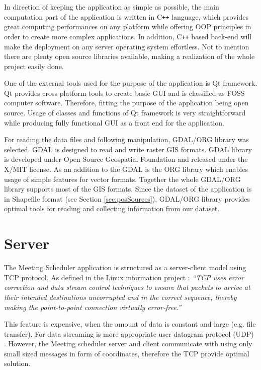 \documentclass[thesis=M,english]{FITthesis}[2012/10/20]
\begin{document}
In direction of keeping the application as simple as possible, the main computation part of the application is written in C\texttt{++} language, which provides great computing performances on any platform while offering OOP principles in order to create more complex applications. In addition, C\texttt{++} based back-end will make the deployment on any server operating system effortless. Not to mention there are plenty open source libraries available, making a realization of the whole project easily done.  

One of the external tools used for the purpose of the application is Qt framework. Qt provides cross-platform tools to create basic GUI and is classified as FOSS computer software. Therefore, fitting the purpose of the application being open source. 
Usage of classes and functions of Qt framework is very straightforward while producing fully functional GUI as a front end for the application. 

For reading the data files and following manipulation, GDAL/ORG library was selected. GDAL is designed to read and write raster GIS formats. GDAL library is developed under Open Source Geospatial Foundation and released under the X/MIT license. 
As an addition to the GDAL is the ORG library which enables usage of simple features for vector formats. Together the whole GDAL/ORG library supports most of the GIS formats. %
Since the dataset of the application is in Shapefile format (see Section \ref{sec:posSources}), GDAL/ORG library provides optimal tools for reading and collecting information from our dataset.

\section{Server}
\label{sec:server}
The Meeting Scheduler application is structured as a server-client model using TCP protocol. As defined in the Linux information project \cite{TCP17}:  \textit{``TCP uses error correction and data stream control techniques to ensure that packets to arrive at their intended destinations uncorrupted and in the correct sequence, thereby making the point-to-point connection virtually error-free.''} 

This feature is expensive, when the amount of data is constant and large (e.g. file transfer). For data streaming is more appropriate user datagram protocol (UDP) \cite{Kurose10}.
However, the Meeting scheduler server and client communicate with using only small sized messages in form of coordinates, therefore the TCP provide optimal solution. 
\end{document}
